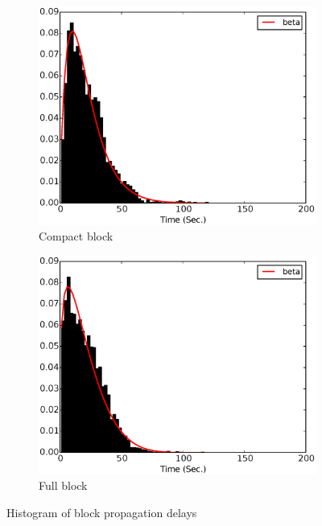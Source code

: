 \begin{figure}[!t]%
\begin{subfigure}{.48\linewidth}
\centering
\includegraphics[width=\linewidth]{image/cmpctblock_time_difference.eps}
\caption{Compact block}
\label{fig:cmpctblock_time_difference}
\end{subfigure}
\centering
\begin{subfigure}{.48\linewidth}
\includegraphics[width=\linewidth]{image/prop_delay_beta.eps}
\caption{Full block}
\label{fig:prop_delay}
\end{subfigure}
\caption{Histogram of block propagation delays}
\label{fig:prop_delay_full_compact}
\end{figure} 



